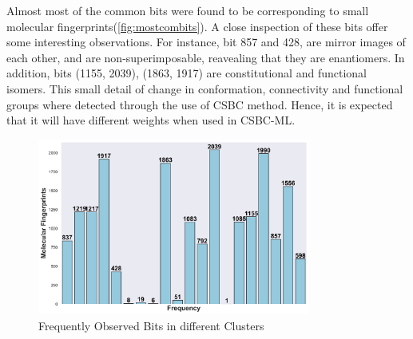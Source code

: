 Almost most of the common bits were found to be corresponding to small molecular fingerprints(\autoref{fig:mostcombits}). A close inspection of these bits offer some interesting observations. For instance, bit 857 and 428, are mirror images of each other, and are non-superimposable, reavealing that they are enantiomers. In addition, bits (1155, 2039), (1863, 1917) are constitutional and functional isomers. This small detail of change in conformation, connectivity and functional groups where detected through the use of CSBC method. Hence, it is expected that it will have different weights when used in CSBC-ML. 
\FloatBarrier
\begin{figure}[h]
	\centering
	\begin{minipage}{\textwidth}
		\centering
		\includegraphics[width=0.8\textwidth]{bit_freq_chart.png}
		\caption{Frequently Observed Bits in different Clusters}
		\label{fig:most_common_bits}
	\end{minipage}
\end{figure}
\FloatBarrier
